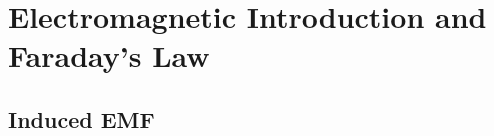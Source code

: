 \chapter{Electromagnetic Introduction and Faraday's Law}

\section{Induced EMF}

\begin{definition}
\end{definition}